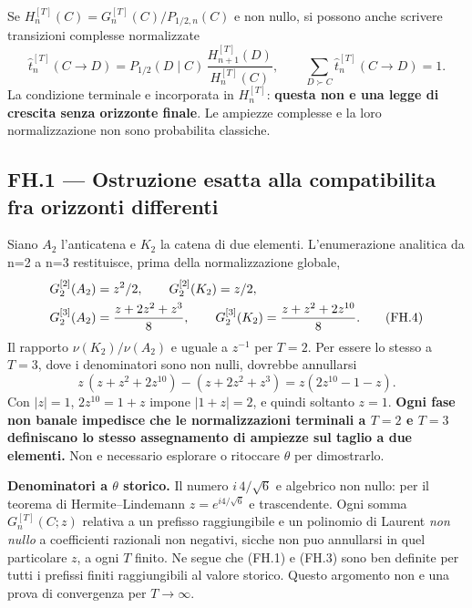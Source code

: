 \documentclass[11pt,a4paper]{article}
\begin{document}
Se $H_n^{[T]}(C)=G_n^{[T]}(C)/P_{1/2,n}(C)$ e non nullo, si possono anche scrivere transizioni complesse normalizzate
\begin{equation}
 \widehat t_n^{[T]}(C\to D)=P_{1/2}(D\mid C)\,
 \frac{H_{n+1}^{[T]}(D)}{H_n^{[T]}(C)},\qquad
 \sum_{D\succ C}\widehat t_n^{[T]}(C\to D)=1.\tag{FH.3}
\end{equation}
La condizione terminale e incorporata in $H_n^{[T]}$: \textbf{questa non e una legge di crescita senza orizzonte finale}. Le ampiezze complesse e la loro normalizzazione non sono probabilita classiche.

\clearpage
\subsection*{FH.1 --- Ostruzione esatta alla compatibilita fra orizzonti differenti}
Siano $A_2$ l'anticatena e $K_2$ la catena di due elementi. L'enumerazione analitica da n=2 a n=3 restituisce, prima della normalizzazione globale,
\begin{align}
 &G_2^{[2]}(A_2)=z^2/2,\qquad G_2^{[2]}(K_2)=z/2,\notag\\
 &G_2^{[3]}(A_2)=\frac{z+2z^2+z^3}{8},\qquad
 G_2^{[3]}(K_2)=\frac{z+z^2+2z^{10}}8.\tag{FH.4}
\end{align}
Il rapporto $\nu(K_2)/\nu(A_2)$ e uguale a $z^{-1}$ per $T=2$. Per essere lo stesso a $T=3$, dove i denominatori sono non nulli, dovrebbe annullarsi
\begin{equation}
 z\,(z+z^2+2z^{10})-(z+2z^2+z^3)
 =z(2z^{10}-1-z).\tag{FH.5}
\end{equation}
Con $|z|=1$, $2z^{10}=1+z$ impone $|1+z|=2$, e quindi soltanto $z=1$. \textbf{Ogni fase non banale impedisce che le normalizzazioni terminali a $T=2$ e $T=3$ definiscano lo stesso assegnamento di ampiezze sul taglio a due elementi.} Non e necessario esplorare o ritoccare $\theta$ per dimostrarlo.

\textbf{Denominatori a $\theta$ storico.} Il numero $i\,4/\sqrt6$ e algebrico non nullo: per il teorema di Hermite--Lindemann $z=e^{i4/\sqrt6}$ e trascendente. Ogni somma $G_n^{[T]}(C;z)$ relativa a un prefisso raggiungibile e un polinomio di Laurent \emph{non nullo} a coefficienti razionali non negativi, sicche non puo annullarsi in quel particolare $z$, a ogni $T$ finito. Ne segue che (FH.1) e (FH.3) sono ben definite per tutti i prefissi finiti raggiungibili al valore storico. Questo argomento non e una prova di convergenza per $T\to\infty$.
\end{document}

